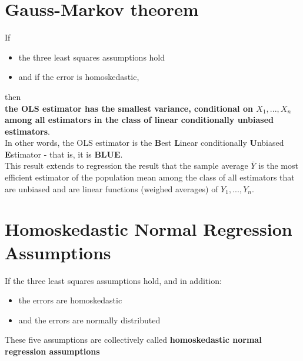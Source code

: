 \section{Gauss-Markov theorem}
If
\begin{itemize}
	\item the three least squares assumptions hold
	\item and if the error is homoskedastic, 
\end{itemize}
then\\
\textbf{\color{blue}the OLS estimator has the smallest variance, conditional on $X_{1}, ..., X_{n}$ among all estimators in the class of \color{red}linear \color{ForestGreen}conditionally unbiased \color{blue}estimators}.\\
In other words, the OLS estimator is the \textbf{\color{blue}B}est \textbf{\color{blue}L}inear conditionally \textbf{\color{blue}U}nbiased \textbf{\color{blue}E}stimator - that is, it is \textbf{\color{blue}BLUE}.\\
This result extends to regression the result that the sample average $\bar{Y}$ is the most efficient estimator of the population mean among the class of all estimators that are unbiased and are linear functions (weighed averages) of $Y_{1}, ..., Y_{n}$.

\section{Homoskedastic Normal Regression Assumptions}
If the three least squares assumptions hold, and in addition:
\begin{itemize}
	\item the errors are homoskedastic
	\item and the errors are normally distributed
\end{itemize}
These five assumptions are collectively called \textbf{\color{blue}homoskedastic normal regression assumptions}